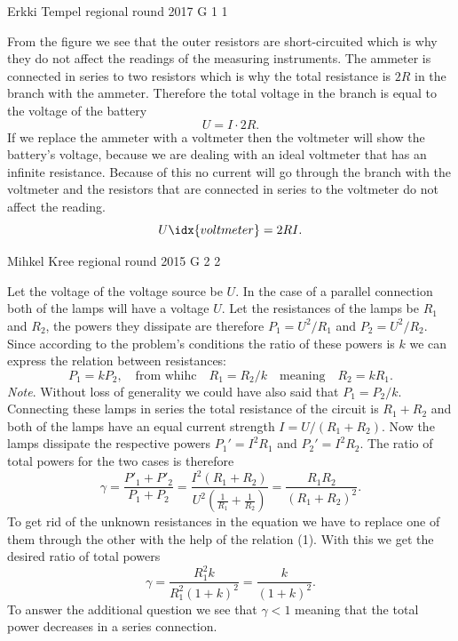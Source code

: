 \documentclass[11pt]{article}
\begin{document}
{Erkki Tempel} %
{regional round} %
{2017} %
{G 1} %
{1} %
{

\ifEngSolution
From the figure we see that the outer resistors are short-circuited which is why they do not affect the readings of the measuring instruments. The ammeter is connected in series to two resistors which is why the total resistance is $2R$ in the branch with the ammeter. Therefore the total voltage in the branch is equal to the voltage of the battery
\[ U = I\cdot 2R.\] 
If we replace the ammeter with a voltmeter then the voltmeter will show the battery’s voltage, because we are dealing with an ideal voltmeter that has an infinite resistance. Because of this no current will go through the branch with the voltmeter and the resistors that are connected in series to the voltmeter do not affect the reading.
\[ U\idx{voltmeter} = 2RI.\]
\fi
}

{Mihkel Kree} %
{regional round} %
{2015} %
{G 2} %
{2} %
{

\ifEngSolution
Let the voltage of the voltage source be $U$. In the case of a parallel connection both of the lamps will have a voltage $U$. Let the resistances of the lamps be $R_1$ and $R_2$, the powers they dissipate are therefore $P_1=U^2/R_1$ and $P_2=U^2/R_2$. Since according to the problem’s conditions the ratio of these powers is $k$ we can express the relation between resistances:
\begin{equation}
\label{eq:R12suhe}
P_1 = kP_2, \quad \text{from whihc} \quad R_1 = R_2/k \quad \text{meaning} \quad R_2=kR_1.
\end{equation}
\emph{Note}. Without loss of generality we could have also said that $P_1 = P_2/k$.\\
Connecting these lamps in series the total resistance of the circuit is $R_1+R_2$ and both of the lamps have an equal current strength $I=U/(R_1+R_2)$. Now the lamps dissipate the respective powers $P_1'=I^2R_1$ and $P_2'=I^2R_2$.
The ratio of total powers for the two cases is therefore
\[
\gamma = \frac{P'_1+P'_2}{P_1+P_2} = \frac{I^2(R_1+R_2)}{U^2(\frac{1}{R_1}+\frac{1}{R_2})}=
\frac{R_1R_2}{(R_1+R_2)^2}.
\] 
To get rid of the unknown resistances in the equation we have to replace one of them through the other with the help of the relation (1). With this we get the desired ratio of total powers
\[
\gamma = \frac{R_1^2 k}{R_1^2(1+k)^2} = \frac{k}{(1+k)^2}.
\] 
To answer the additional question we see that $\gamma < 1$ meaning that the total power decreases in a series connection.
\fi
}
\end{document}

